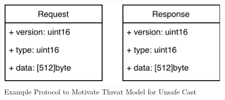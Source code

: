\begin{figure}[htp!]
    \centering
    \includegraphics[width=\textwidth]{assets/figures/chapter3/protocol.pdf}
    \caption{Example Protocol to Motivate Threat Model for Unsafe Cast}
    \label{fig:protocol-threat-model}
\end{figure}
